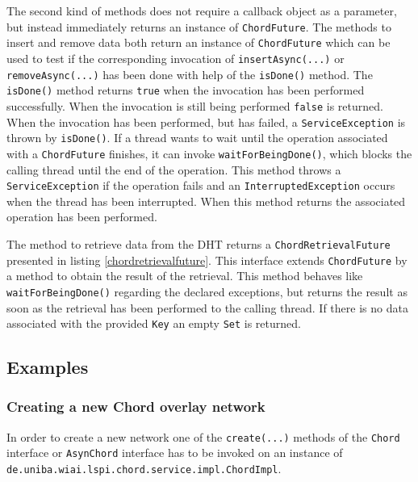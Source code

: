 The second kind of methods does not require a callback object as a parameter, but 
instead immediately returns an instance of {\tt ChordFuture}. The methods to insert 
and remove data both return an instance of {\tt ChordFuture} which can be used 
to test if the corresponding invocation of {\tt insertAsync(...)} or {\tt removeAsync(...)} has been done with help of the {\tt isDone()} method. 
%
%
The {\tt isDone()}  
method returns {\tt true} when the invocation has been performed successfully. 
When the invocation is still being performed {\tt false} is returned. When 
the invocation has been performed, but has failed, a {\tt ServiceException} 
is thrown by {\tt isDone()}. 
If a thread wants to wait until the operation associated with a {\tt ChordFuture} 
finishes, it can invoke {\tt waitForBeingDone()}, which blocks the calling thread 
until the end of the operation. This method throws a {\tt ServiceException} if the 
operation fails and an {\tt InterruptedException} occurs when the thread has been 
interrupted. When this method returns the associated operation has been performed. 


The method to retrieve data from the DHT returns a {\tt ChordRetrievalFuture} presented 
in listing \ref{chordretrievalfuture}. This interface extends {\tt ChordFuture} by a method to obtain the result of the retrieval. This method behaves like 
{\tt waitForBeingDone()} regarding the declared exceptions, but returns the result 
as soon as the retrieval has been performed to the calling thread. If there is no 
data associated with the provided {\tt Key} an empty {\tt Set} is returned. 

\subsection{Examples}
\subsubsection{Creating a new Chord overlay network} 
In order to create a new network one of the {\tt create(...)} methods 
of the {\tt Chord} interface or {\tt AsynChord} interface has to be invoked 
on an instance of 
{\tt de.\-uniba.\-wiai.\-lspi.\-chord.\-service.\-impl.\-ChordImpl}. 


